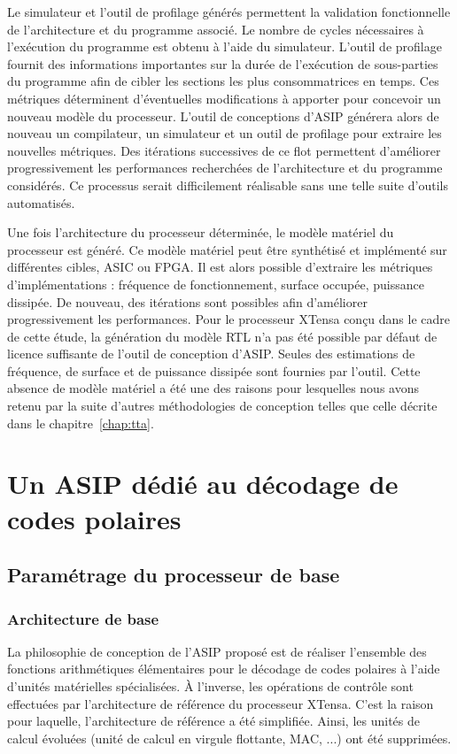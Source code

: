 Le simulateur et l'outil de profilage générés permettent la validation fonctionnelle de l'architecture et du programme associé. Le nombre de cycles nécessaires à l'exécution du programme est obtenu à l'aide du simulateur. L'outil de profilage fournit des informations importantes sur la durée de l'exécution de sous-parties du programme afin de cibler les sections les plus consommatrices en temps. Ces métriques déterminent d'éventuelles modifications à apporter pour concevoir un nouveau modèle du processeur. L'outil de conceptions d'ASIP générera alors de nouveau un compilateur, un simulateur et un outil de profilage pour extraire les nouvelles métriques. Des itérations successives de ce flot permettent d'améliorer progressivement les performances recherchées de l'architecture et du programme considérés. Ce processus serait difficilement réalisable sans une telle suite d'outils automatisés.

Une fois l'architecture du processeur déterminée, le modèle matériel du processeur est généré. Ce modèle matériel peut être synthétisé et implémenté sur différentes cibles, ASIC ou FPGA. Il est alors possible d'extraire les métriques d'implémentations : fréquence de fonctionnement, surface occupée, puissance dissipée. De nouveau, des itérations sont possibles afin d'améliorer progressivement les performances.
Pour le processeur XTensa conçu dans le cadre de cette étude, la génération du modèle RTL n'a pas été possible par défaut de licence suffisante de l'outil de conception d'ASIP. Seules des estimations de fréquence, de surface et de puissance dissipée sont fournies par l'outil. Cette absence de modèle matériel a été une des raisons pour lesquelles nous avons retenu par la suite d'autres méthodologies de conception telles que celle décrite dans le chapitre~\ref{chap:tta}.

\section{Un ASIP dédié au décodage de codes polaires}
\label{sec:tensilica_design}
\subsection{Paramétrage du processeur de base}
\subsubsection{Architecture de base}
La philosophie de conception de l'ASIP proposé est de réaliser l'ensemble des fonctions arithmétiques élémentaires pour le décodage de codes polaires à l'aide d'unités matérielles spécialisées. \`A l'inverse, les opérations de contrôle sont effectuées par l'architecture de référence du processeur XTensa. C'est la raison pour laquelle, l'architecture de référence a été simplifiée. Ainsi, les unités de calcul évoluées (unité de calcul en virgule flottante, MAC, ...) ont été supprimées.

